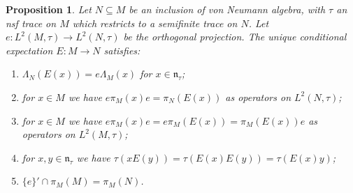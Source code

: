 \documentclass[a4paper,11pt]{article}
\newcommand{\mf}[1]{{\mathfrak{#1}}}
\newtheorem{proposition}[lemma]{Proposition}
\theoremstyle{definition}
\begin{document}
\begin{proposition}\label{prop:Eprops}
Let $N\subseteq M$ be an inclusion of von Neumann algebra, with $\tau$ an nsf trace on $M$ which restricts to a semifinite trace on $N$.  Let $e\colon L^2(M,\tau) \to L^2(N,\tau)$ be the orthogonal projection.  The unique conditional expectation $E\colon M \to N$ satisfies:
\begin{enumerate}
  \item\label{prop:Eprops:one}
  $\Lambda_N(E(x)) = e \Lambda_M(x)$ for $x\in\mf n_\tau$;
  \item\label{prop:Eprops:two}
  for $x\in M$ we have $e\pi_M(x)e = \pi_N(E(x))$ as operators on $L^2(N,\tau)$;
  \item\label{prop:Eprops:twoa}
  for $x\in M$ we have $e\pi_M(x)e = e \pi_M(E(x)) = \pi_M(E(x)) e$ as operators on $L^2(M,\tau)$;
  \item\label{prop:Eprops:three}
  for $x,y\in\mf n_\tau$ we have $\tau(xE(y)) = \tau(E(x)E(y)) = \tau(E(x)y)$;
  \item\label{prop:Eprops:four}
  $\{e\}' \cap \pi_M(M) = \pi_M(N)$.
\end{enumerate}
\end{proposition}
\end{document}
